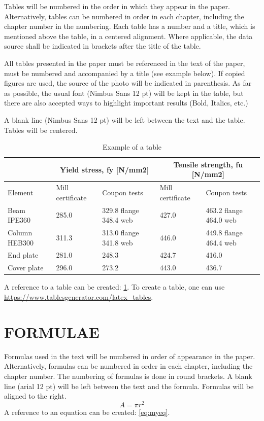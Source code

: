Tables will be numbered in the order in which they appear in the paper. Alternatively, tables can be numbered in order in each chapter, including the chapter number in the numbering. Each table has a number and a title, which is mentioned above the table, in a centered alignment. Where applicable, the data source shall be indicated in brackets after the title of the table.

All tables presented in the paper must be referenced in the text of the paper, must be numbered and accompanied by a title (see example below). If copied figures are used, the source of the photo will be indicated in parenthesis. As far as possible, the usual font (Nimbus Sans 12 pt) will be kept in the table, but there are also accepted ways to highlight important results (Bold, Italics, etc.)

A blank line (Nimbus Sans 12 pt) will be left between the text and the table. Tables will be centered. 

\begin{table}[h]
\caption{Example of a table}
\label{table:table1}
\begin{tabular}{ |p{2.9cm}|p{2cm}|p{3cm}|p{2cm}|p{3cm}|  }
 \hline
  &  \multicolumn{2}{|c|}{Yield stress, fy [N/mm2]} & \multicolumn{2}{|c|}{Tensile strength, fu [N/mm2]} \\
 \hline
 Element & Mill certificate & Coupon tests & Mill certificate & Coupon tests \\
 \hline
 Beam IPE360 & 285.0 & 329.8 flange 348.4 web & 427.0 & 463.2 flange 464.0 web \\
 \hline
 Column HEB300 & 311.3 & 313.0 flange 341.8 web	& 446.0	& 449.8 flange 464.4 web \\
 \hline
 End plate & 281.0 & 248.3 & 424.7 & 416.0 \\
 \hline
 Cover plate & 296.0 & 273.2 & 443.0 & 436.7 \\
 \hline
\end{tabular}
\end{table}


A reference to a table can be created: \cref{table:table1}. To create a table, one can use \label{example:table_url} \url{https://www.tablesgenerator.com/latex_tables}.

\section{FORMULAE}

Formulas used in the text will be numbered in order of appearance in the paper. Alternatively, formulas can be numbered in order in each chapter, including the chapter number. The numbering of formulas is done in round brackets. A blank line (arial 12 pt) will be left between the text and the formula. Formulas will be aligned to the right.
\begin{equation}
\label{eq:myeq}
A=\pi r^2
\end{equation}
A reference to an equation can be created: \cref{eq:myeq}. 

